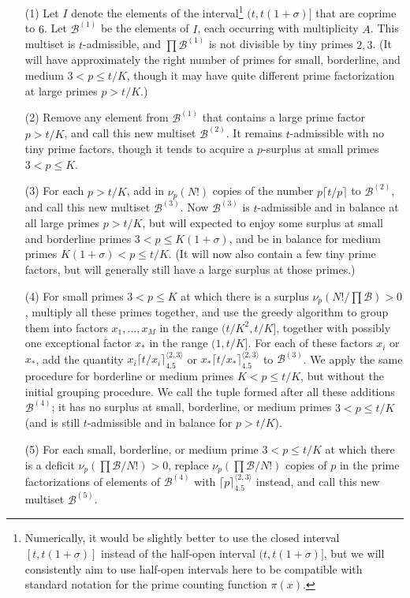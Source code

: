 \documentclass[12pt,a4paper,reqno]{amsart}
\numberwithin{equation}{section}
\theoremstyle{plain}
\theoremstyle{definition}
\newcommand\tuple{{\mathcal B}}
\begin{document}
\begin{enumerate}
\item[(1)] Let $I$ denote the elements of the interval\footnote{Numerically, it would be slightly better to use the closed interval $[t,t(1+\sigma)]$ instead of the half-open interval $(t,t(1+\sigma)]$, but we will consistently aim to use half-open intervals here to be compatible with standard notation for the prime counting function $\pi(x)$.} $(t,t(1+\sigma)]$ that are coprime to $6$.  Let $\tuple^{(1)}$ be the elements of $I$, each occurring with multiplicity $A$.  This multiset is $t$-admissible, and $\prod \tuple^{(1)}$ is not divisible by tiny primes $2,3$.  (It will have approximately the right number of primes for small, borderline, and medium $3 < p \leq t/K$, though it may have quite different prime factorization at large primes $p>t/K$.)
\item[(2)] Remove any element from $\tuple^{(1)}$ that contains a large prime factor $p > t/K$, and call this new multiset $\tuple^{(2)}$.  It remains $t$-admissible with no tiny prime factors, though it tends to acquire a $p$-surplus at small primes $3 < p \leq K$.
\item[(3)] For each $p > t/K$, add in $\nu_p(N!)$ copies of the number $p \lceil t/p \rceil$ to $\tuple^{(2)}$, and call this new multiset $\tuple^{(3)}$.   Now $\tuple^{(3)}$ is $t$-admissible and in balance at all large primes $p>t/K$, but will expected to enjoy some surplus at small and borderline primes $3 < p \leq K(1+\sigma)$, and be in balance for medium primes $K(1+\sigma) < p \leq t/K$.  (It will now also contain a few tiny prime factors, but will generally still have a large surplus at those primes.)
\item [(4)] For small primes $3 < p \leq K$ at which there is a surplus $\nu_p(N!/\prod \tuple) > 0$, multiply all these primes together, and use the greedy algorithm to group them into factors $x_1, \dots, x_M$ in the range
$(t/K^2, t/K]$, together with possibly one exceptional factor $x_*$ in the range $(1, t/K]$.  For each of these factors $x_i$ or $x_*$, add the quantity $x_i \lceil t/x_i \rceil^{\langle 2,3 \rangle}_{4.5}$ or $x_* \lceil t/x_* \rceil^{\langle 2,3 \rangle}_{4.5}$ to $\tuple^{(3)}$.  We apply the same procedure for borderline or medium primes $K < p \leq t/K$, but without the initial grouping procedure.  We call the tuple formed after all these additions $\tuple^{(4)}$; it has no surplus at small, borderline, or medium primes $3 < p \leq t/K$ (and is still $t$-admissible and in balance for $p>t/K$).
\item[(5)] For each small, borderline, or medium prime $3 < p \leq t/K$ at which there is a deficit $\nu_p(\prod \tuple/N!) > 0$, replace $\nu_p(\prod \tuple/N!)$ copies of $p$ in the prime factorizations of elements of $\tuple^{(4)}$ with $\lceil p \rceil^{\langle 2,3 \rangle}_{4.5}$ instead, and call this new multiset $\tuple^{(5)}$.  

\end{enumerate}
\end{document}
